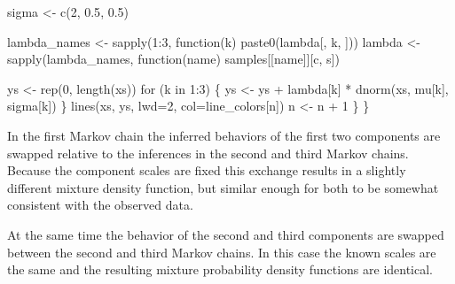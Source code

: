 \documentclass[
  letterpaper,
  DIV=11,
  numbers=noendperiod]{scrartcl}
\newenvironment{Shaded}{\begin{snugshade}}{\end{snugshade}}
\newcommand{\AttributeTok}[1]{\textcolor[rgb]{0.40,0.45,0.13}{#1}}
\newcommand{\ControlFlowTok}[1]{\textcolor[rgb]{0.00,0.23,0.31}{#1}}
\newcommand{\DecValTok}[1]{\textcolor[rgb]{0.68,0.00,0.00}{#1}}
\newcommand{\FloatTok}[1]{\textcolor[rgb]{0.68,0.00,0.00}{#1}}
\newcommand{\FunctionTok}[1]{\textcolor[rgb]{0.28,0.35,0.67}{#1}}
\newcommand{\NormalTok}[1]{\textcolor[rgb]{0.00,0.23,0.31}{#1}}
\newcommand{\OtherTok}[1]{\textcolor[rgb]{0.00,0.23,0.31}{#1}}
\newcommand{\SpecialCharTok}[1]{\textcolor[rgb]{0.37,0.37,0.37}{#1}}
\newcommand{\StringTok}[1]{\textcolor[rgb]{0.13,0.47,0.30}{#1}}
\begin{document}
\begin{Shaded}
\begin{Highlighting}[]
\NormalTok{    sigma }\OtherTok{\textless{}{-}} \FunctionTok{c}\NormalTok{(}\DecValTok{2}\NormalTok{, }\FloatTok{0.5}\NormalTok{, }\FloatTok{0.5}\NormalTok{)}

\NormalTok{    lambda\_names }\OtherTok{\textless{}{-}} \FunctionTok{sapply}\NormalTok{(}\DecValTok{1}\SpecialCharTok{:}\DecValTok{3}\NormalTok{, }\ControlFlowTok{function}\NormalTok{(k) }\FunctionTok{paste0}\NormalTok{(}\StringTok{\textquotesingle{}lambda[\textquotesingle{}}\NormalTok{, k, }\StringTok{\textquotesingle{}]\textquotesingle{}}\NormalTok{))}
\NormalTok{    lambda }\OtherTok{\textless{}{-}} \FunctionTok{sapply}\NormalTok{(lambda\_names, }\ControlFlowTok{function}\NormalTok{(name) samples[[name]][c, s])}

\NormalTok{    ys }\OtherTok{\textless{}{-}} \FunctionTok{rep}\NormalTok{(}\DecValTok{0}\NormalTok{, }\FunctionTok{length}\NormalTok{(xs))}
    \ControlFlowTok{for}\NormalTok{ (k }\ControlFlowTok{in} \DecValTok{1}\SpecialCharTok{:}\DecValTok{3}\NormalTok{) \{}
\NormalTok{      ys }\OtherTok{\textless{}{-}}\NormalTok{ ys }\SpecialCharTok{+}\NormalTok{ lambda[k] }\SpecialCharTok{*} \FunctionTok{dnorm}\NormalTok{(xs, mu[k], sigma[k])}
\NormalTok{    \}}
    \FunctionTok{lines}\NormalTok{(xs, ys, }\AttributeTok{lwd=}\DecValTok{2}\NormalTok{, }\AttributeTok{col=}\NormalTok{line\_colors[n])}
\NormalTok{    n }\OtherTok{\textless{}{-}}\NormalTok{ n }\SpecialCharTok{+} \DecValTok{1}
\NormalTok{  \}}
\NormalTok{\}}
\end{Highlighting}
\end{Shaded}

In the first Markov chain the inferred behaviors of the first two
components are swapped relative to the inferences in the second and
third Markov chains. Because the component scales are fixed this
exchange results in a slightly different mixture density function, but
similar enough for both to be somewhat consistent with the observed
data.

At the same time the behavior of the second and third components are
swapped between the second and third Markov chains. In this case the
known scales are the same and the resulting mixture probability density
functions are identical.
\end{document}
